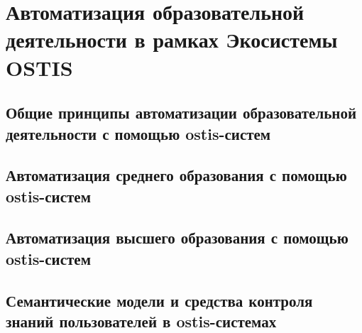 \chapter{Автоматизация образовательной деятельности в рамках Экосистемы OSTIS}
\label{chapter_learning_systems}


\section{Общие принципы автоматизации образовательной деятельности с помощью ostis-систем}
\section{Автоматизация среднего образования с помощью ostis-систем}
\section{Автоматизация высшего образования с помощью ostis-систем}
\section{Семантические модели и средства контроля знаний пользователей в ostis-системах}
\label{section_knowledge_control}

%